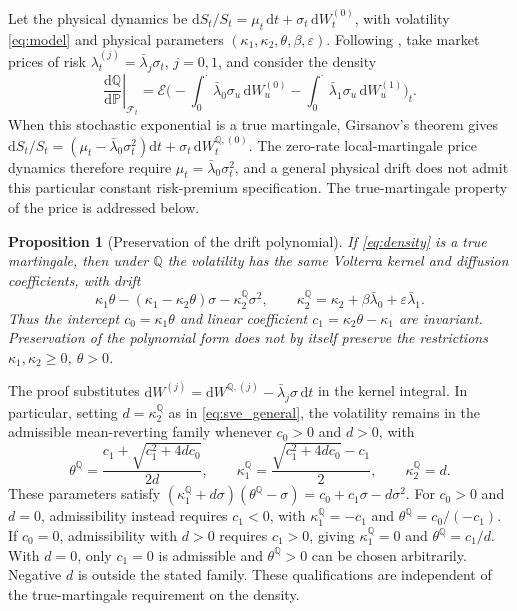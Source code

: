 \documentclass{rQUF2e}
\theoremstyle{plain}
\newtheorem{proposition}[theorem]{Proposition}
\theoremstyle{definition}
\theoremstyle{remark}
\newcommand{\D}{\mathrm{d}}
\newcommand{\Q}{\mathbb{Q}}
\renewcommand{\P}{\mathbb{P}}
\newcommand{\F}{\mathcal{F}}
\begin{document}
Let the physical dynamics be $\D S_t/S_t=\mu_t\,\D t+\sigma_t\,\D W^{(0)}_t$, with volatility \eqref{eq:model} and physical parameters $(\kappa_1,\kappa_2,\theta,\beta,\varepsilon)$. Following \citet{SeppRakhmonov2023}, take market prices of risk $\lambda^{(j)}_t=\bar\lambda_j\sigma_t$, $j=0,1$, and consider the density
\begin{equation}\label{eq:density}
\left.\frac{\D\Q}{\D\P}\right|_{\F_t}=\mathcal{E}\Big(-\int_0^\cdot\bar\lambda_0\sigma_u\,\D W^{(0)}_u-\int_0^\cdot\bar\lambda_1\sigma_u\,\D W^{(1)}_u\Big)_t .
\end{equation}
When this stochastic exponential is a true martingale, Girsanov's theorem gives
$\D S_t/S_t=(\mu_t-\bar\lambda_0\sigma_t^2)\D t+\sigma_t\,\D W^{\Q,(0)}_t$.
The zero-rate local-martingale price dynamics therefore require $\mu_t=\bar\lambda_0\sigma_t^2$, and a general physical drift does not admit this particular constant risk-premium specification. The true-martingale property of the price is addressed below.

\begin{proposition}[Preservation of the drift polynomial]\label{prop:closure}
If \eqref{eq:density} is a true martingale, then under $\Q$ the volatility has the same Volterra kernel and diffusion coefficients, with drift
\begin{equation}\label{eq:drift_Q}
\kappa_1\theta-(\kappa_1-\kappa_2\theta)\sigma-\kappa_2^{\Q}\sigma^2,\qquad \kappa_2^{\Q}=\kappa_2+\beta\bar\lambda_0+\varepsilon\bar\lambda_1 .
\end{equation}
Thus the intercept $c_0=\kappa_1\theta$ and linear coefficient $c_1=\kappa_2\theta-\kappa_1$ are invariant. Preservation of the polynomial form does not by itself preserve the restrictions $\kappa_1,\kappa_2\ge0$, $\theta>0$.
\end{proposition}

The proof substitutes $\D W^{(j)}=\D W^{\Q,(j)}-\bar\lambda_j\sigma\,\D t$ in the kernel integral. In particular, setting $d=\kappa_2^{\Q}$ as in \eqref{eq:sve_general}, the volatility remains in the admissible mean-reverting family whenever $c_0>0$ and $d>0$, with
\begin{equation*}
\theta^{\Q}=\frac{c_1+\sqrt{c_1^2+4dc_0}}{2d},\qquad
\kappa_1^{\Q}=\frac{\sqrt{c_1^2+4dc_0}-c_1}{2},\qquad
\kappa_2^{\Q}=d.
\end{equation*}
These parameters satisfy $(\kappa_1^{\Q}+d\sigma)(\theta^{\Q}-\sigma)=c_0+c_1\sigma-d\sigma^2$.
For $c_0>0$ and $d=0$, admissibility instead requires $c_1<0$, with $\kappa_1^{\Q}=-c_1$ and $\theta^{\Q}=c_0/(-c_1)$. If $c_0=0$, admissibility with $d>0$ requires $c_1>0$, giving $\kappa_1^{\Q}=0$ and $\theta^{\Q}=c_1/d$. With $d=0$, only $c_1=0$ is admissible and $\theta^{\Q}>0$ can be chosen arbitrarily. Negative $d$ is outside the stated family. These qualifications are independent of the true-martingale requirement on the density.
\end{document}
